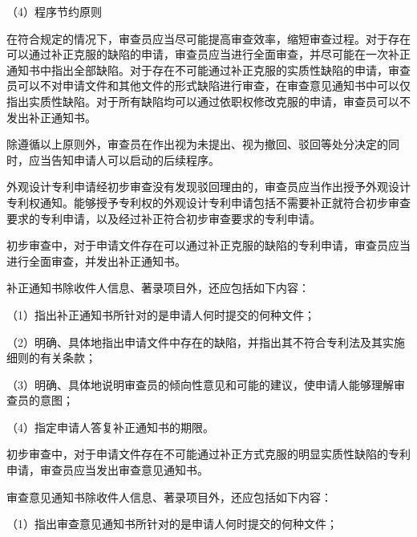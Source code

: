 {\setlength{\parindent}{17.1bp}（4）程序节约原则\par}

{\setlength{\parindent}{22.7bp}在符合规定的情况下，审查员应当尽可能提高审查效率，缩短审查过程。对于存在可以通过补正克服的缺陷的申请，审查员应当进行全面审查，并尽可能在一次补正通知书中指出全部缺陷。对于存在不可能通过补正克服的实质性缺陷的申请，审查员可以不对申请文件和其他文件的形式缺陷进行审查，在审查意见通知书中可以仅指出实质性缺陷。对于所有缺陷均可以通过依职权修改克服的申请，审查员可以不发出补正通知书。\par}

{\setlength{\parindent}{22.7bp}除遵循以上原则外，审查员在作出视为未提出、视为撤回、驳回等处分决定的同时，应当告知申请人可以启动的后续程序。\par}

外观设计专利申请经初步审查没有发现驳回理由的，审查员应当作出授予外观设计专利权通知。能够授予专利权的外观设计专利申请包括不需要补正就符合初步审查要求的专利申请，以及经过补正符合初步审查要求的专利申请。

初步审查中，对于申请文件存在可以通过补正克服的缺陷的专利申请，审查员应当进行全面审查，并发出补正通知书。

补正通知书除收件人信息、著录项目外，还应包括如下内容：

{\setlength{\parindent}{17.1bp}（1）指出补正通知书所针对的是申请人何时提交的何种文件；\par}

{\setlength{\parindent}{17.1bp}（2）明确、具体地指出申请文件中存在的缺陷，并指出其不符合专利法及其实施细则的有关条款；\par}

{\setlength{\parindent}{17.1bp}（3）明确、具体地说明审查员的倾向性意见和可能的建议，使申请人能够理解审查员的意图；\par}

{\setlength{\parindent}{17.1bp}（4）指定申请人答复补正通知书的期限。\par}

初步审查中，对于申请文件存在不可能通过补正方式克服的明显实质性缺陷的专利申请，审查员应当发出审查意见通知书。

审查意见通知书除收件人信息、著录项目外，还应包括如下内容：

{\setlength{\parindent}{17.1bp}（1）指出审查意见通知书所针对的是申请人何时提交的何种文件；\par}

